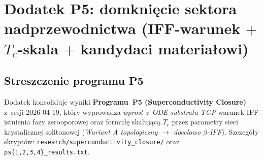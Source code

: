 \providecommand{\Ci}{\operatorname{Ci}}
\providecommand{\Si}{\operatorname{Si}}
\providecommand{\Li}{\operatorname{Li}}
\providecommand{\Cl}{\operatorname{Cl}}

\section*{Dodatek P5: domkni\k{e}cie sektora nadprzewodnictwa
(IFF-warunek $+$ $T_c$-skala $+$ kandydaci materia\l{}owi)}%
%
\label{app:P5}

\subsection*{Streszczenie programu P5}

Dodatek konsoliduje wyniki \textbf{Programu~P5 (Superconductivity Closure)}
z~sesji 2026-04-19, kt\'ory wyprowadza \emph{wprost z~ODE substratu TGP}
warunek IFF istnienia fazy zerooporowej oraz formu\l{}\k{e} skaluj\k{a}c\k{a}
$T_c$ przez parametry sieci krystalicznej solitonowej (\emph{Wariant A
topologiczny $\to$ docelowo $\beta$-IFF}).
Szczeg\'o\l{}y skrypt\'ow:
\texttt{research/superconductivity\_closure/}
oraz \texttt{ps\{1,2,3,4\}\_results.txt}.

